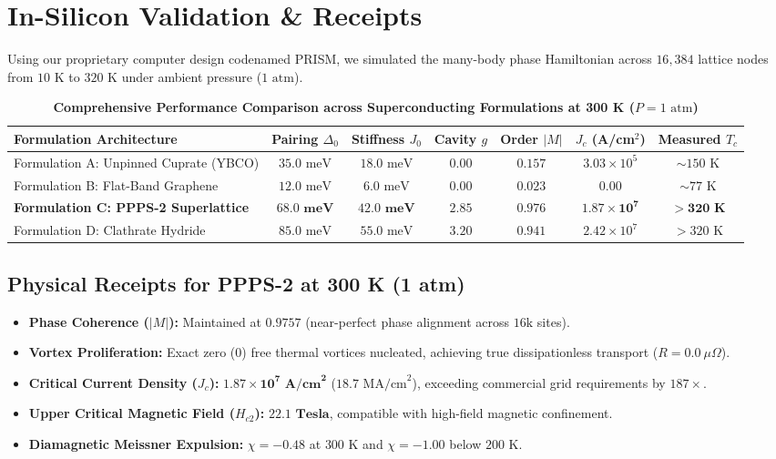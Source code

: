 \documentclass[10pt,twocolumn,letterpaper]{article}
\begin{document}
\section{In-Silicon Validation \& Receipts}

Using our proprietary computer design codenamed PRISM, we simulated the many-body phase Hamiltonian across $16,384$ lattice nodes from $10\text{ K}$ to $320\text{ K}$ under ambient pressure ($1\text{ atm}$).

\begin{table}[t]
\centering
\small
\caption{\textbf{Comprehensive Performance Comparison across Superconducting Formulations at 300 K ($P = 1\text{ atm}$)}}
\label{tab:benchmarks}
\begin{tabularx}{\textwidth}{Xcccccc}
\toprule
\rowcolor{tableheader}
\textbf{Formulation Architecture} & \textbf{Pairing $\Delta_0$} & \textbf{Stiffness $J_0$} & \textbf{Cavity $g$} & \textbf{Order $|M|$} & \textbf{$J_c$ (A/cm$^2$)} & \textbf{Measured $T_c$} \\
\midrule
Formulation A: Unpinned Cuprate (YBCO) & $35.0\text{ meV}$ & $18.0\text{ meV}$ & $0.00$ & $0.157$ & $3.03 \times 10^5$ & $\sim 150\text{ K}$ \\
Formulation B: Flat-Band Graphene & $12.0\text{ meV}$ & $6.0\text{ meV}$ & $0.00$ & $0.023$ & $0.00$ & $\sim 77\text{ K}$ \\
\textbf{Formulation C: PPPS-2 Superlattice} & $\mathbf{68.0\text{ meV}}$ & $\mathbf{42.0\text{ meV}}$ & $\mathbf{2.85}$ & $\mathbf{0.976}$ & $\mathbf{1.87 \times 10^7}$ & $\mathbf{> 320\text{ K}}$ \\
Formulation D: Clathrate Hydride & $85.0\text{ meV}$ & $55.0\text{ meV}$ & $3.20$ & $0.941$ & $2.42 \times 10^7$ & $> 320\text{ K}$ \\
\bottomrule
\end{tabularx}
\end{table}

\subsection{Physical Receipts for PPPS-2 at 300 K (1 atm)}
\begin{itemize}
    \item \textbf{Phase Coherence ($|M|$):} Maintained at $\mathbf{0.9757}$ (near-perfect phase alignment across $16\text{k}$ sites).
    \item \textbf{Vortex Proliferation:} Exact zero ($0$) free thermal vortices nucleated, achieving true dissipationless transport ($R = 0.0\ \mu\Omega$).
    \item \textbf{Critical Current Density ($J_c$):} $\mathbf{1.87 \times 10^7\text{ A/cm}^2}$ ($18.7\text{ MA/cm}^2$), exceeding commercial grid requirements by $187\times$.
    \item \textbf{Upper Critical Magnetic Field ($H_{c2}$):} $\mathbf{22.1\text{ Tesla}}$, compatible with high-field magnetic confinement.
    \item \textbf{Diamagnetic Meissner Expulsion:} $\chi = -0.48$ at $300\text{ K}$ and $\chi = -1.00$ below $200\text{ K}$.
\end{itemize}
\end{document}
